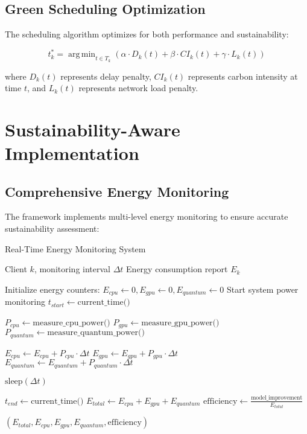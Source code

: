 \documentclass[10pt,journal,compsoc]{IEEEtran}
\DeclareMathOperator*{\argmin}{arg\,min}
\begin{document}
\subsection{Green Scheduling Optimization}

The scheduling algorithm optimizes for both performance and sustainability:

\begin{equation}
t_k^* = \argmin_{t \in T_k} \left( \alpha \cdot D_k(t) + \beta \cdot CI_k(t) + \gamma \cdot L_k(t) \right)
\label{eq:green_scheduling}
\end{equation}

where $D_k(t)$ represents delay penalty, $CI_k(t)$ represents carbon intensity at time $t$, and $L_k(t)$ represents network load penalty.

\section{Sustainability-Aware Implementation}

\subsection{Comprehensive Energy Monitoring}

The framework implements multi-level energy monitoring to ensure accurate sustainability assessment:

\begin{algorithm}[!t]
\caption{Real-Time Energy Monitoring System}
\label{alg:energy_monitoring}
\begin{algorithmic}[1]
\Require Client $k$, monitoring interval $\Delta t$
\Ensure Energy consumption report $E_k$

\State Initialize energy counters: $E_{cpu} \leftarrow 0, E_{gpu} \leftarrow 0, E_{quantum} \leftarrow 0$
\State Start system power monitoring
\State $t_{start} \leftarrow \text{current\_time()}$

    \State $P_{cpu} \leftarrow \text{measure\_cpu\_power()}$
    \State $P_{gpu} \leftarrow \text{measure\_gpu\_power()}$
    \State $P_{quantum} \leftarrow \text{measure\_quantum\_power()}$
    
    \State $E_{cpu} \leftarrow E_{cpu} + P_{cpu} \cdot \Delta t$
    \State $E_{gpu} \leftarrow E_{gpu} + P_{gpu} \cdot \Delta t$
    \State $E_{quantum} \leftarrow E_{quantum} + P_{quantum} \cdot \Delta t$
    
    \State $\text{sleep}(\Delta t)$
\EndWhile

\State $t_{end} \leftarrow \text{current\_time()}$
\State $E_{total} \leftarrow E_{cpu} + E_{gpu} + E_{quantum}$
\State $\text{efficiency} \leftarrow \frac{\text{model\_improvement}}{E_{total}}$

\State \Return $(E_{total}, E_{cpu}, E_{gpu}, E_{quantum}, \text{efficiency})$
\end{algorithmic}
\end{algorithm}
\end{document}
